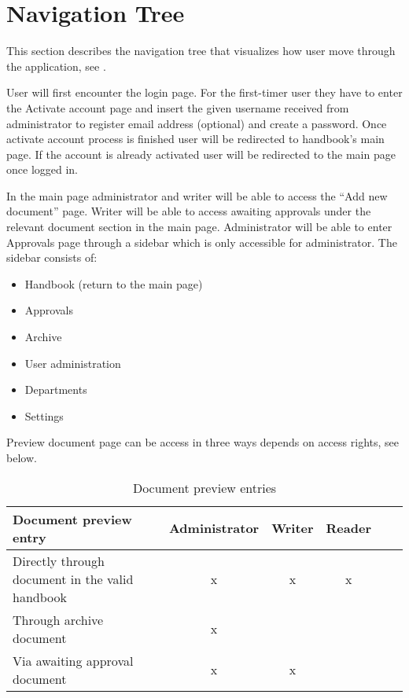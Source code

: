 \section{Navigation Tree}
This section describes the navigation tree that visualizes how user move through the application, see .


User will first encounter the login page.
For the first-timer user they have to enter the Activate account page and insert the given username received from administrator to register email address (optional) and create a password.
Once activate account process is finished user will be redirected to handbook's main page.
If the account is already activated user will be redirected to the main page once logged in.

In the main page administrator and writer will be able to access the ``Add new document'' page.
Writer will be able to access awaiting approvals under the relevant document section in the main page.
Administrator will be able to enter Approvals page through a sidebar which is only accessible for administrator.
The sidebar consists of:

\begin{itemize}
	\item Handbook (return to the main page)
	\item Approvals
	\item Archive
	\item User administration
	\item Departments
	\item Settings
\end{itemize}

Preview document page can be access in three ways depends on access rights, see  below.

\begin{table}[H]
	\begin{center}
	\begin{tabular}{| m{20em} | c | c | c | c | c |}
		\hline
		Document preview entry & Administrator & Writer & Reader \\
		\hline
		 Directly through document in the valid handbook & x  & x & x\\
		\hline
		 Through archive document  & x &  & \\
		\hline
		 Via awaiting approval document & x & x &  \\
		\hline
	\end{tabular}
	\end{center}
	\caption{Document preview entries}\label{tab:docPreviewEntries}
\end{table}

